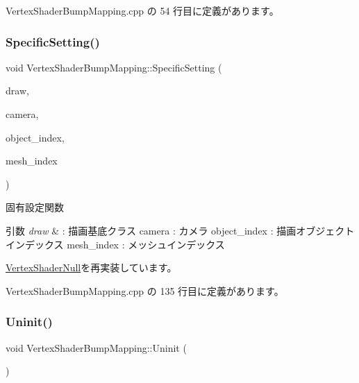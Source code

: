  Vertex\+Shader\+Bump\+Mapping.\+cpp の 54 行目に定義があります。

\mbox{\label{class_vertex_shader_bump_mapping_ad81d57336763441c4071f967b57dbce1}} 
\subsubsection{\texorpdfstring{Specific\+Setting()}{SpecificSetting()}}
{\footnotesize\ttfamily void Vertex\+Shader\+Bump\+Mapping\+::\+Specific\+Setting (\begin{DoxyParamCaption}\item[{\mbox{\hyperlink{class_draw_base}{Draw\+Base}} $\ast$}]{draw,  }\item[{\mbox{\hyperlink{class_camera}{Camera}} $\ast$}]{camera,  }\item[{unsigned}]{object\+\_\+index,  }\item[{unsigned}]{mesh\+\_\+index }\end{DoxyParamCaption})\hspace{0.3cm}{\ttfamily [virtual]}}



固有設定関数 


\begin{DoxyParams}{引数}
{\em draw} & \+: 描画基底クラス camera \+: カメラ object\+\_\+index \+: 描画オブジェクトインデックス mesh\+\_\+index \+: メッシュインデックス \\
\hline
\end{DoxyParams}


\mbox{\hyperlink{class_vertex_shader_null_aa2234c6ea083e3c0233d59f222145992}{Vertex\+Shader\+Null}}を再実装しています。



 Vertex\+Shader\+Bump\+Mapping.\+cpp の 135 行目に定義があります。

\mbox{\label{class_vertex_shader_bump_mapping_abed4e0aa9655fa7a7a21e03d00e7c0e5}} 
\subsubsection{\texorpdfstring{Uninit()}{Uninit()}}
{\footnotesize\ttfamily void Vertex\+Shader\+Bump\+Mapping\+::\+Uninit (\begin{DoxyParamCaption}{ }\end{DoxyParamCaption})\hspace{0.3cm}{\ttfamily [virtual]}}



